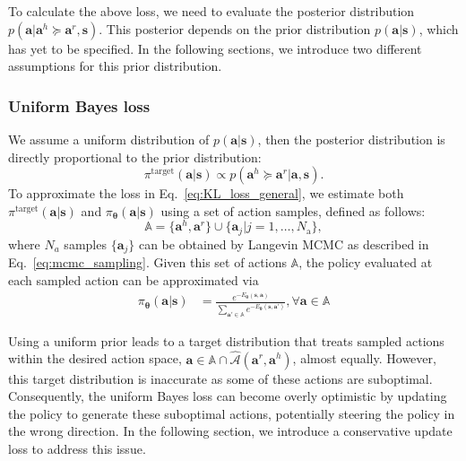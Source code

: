 To calculate the above loss, we need to evaluate the posterior distribution $p(\bm a|\bm a^h \succeq \bm a^r, \bm s) $.
This posterior depends on the prior distribution $p(\bm a | \bm s)$, which has yet to be specified.
In the following sections, we introduce two different assumptions for this prior distribution.

\subsubsection{ Uniform Bayes loss}
\label{sec:sub:sub:uniform_bayes_loss}
We assume a uniform distribution of $p(\bm a | \bm s)$, then the posterior distribution is directly proportional to the prior distribution:
\begin{equation*}
   \pi^{\text{target}}(\bm a| \bm s )  \propto p (\bm a^h \succeq \bm a^r | \bm a ,\bm s). 
\end{equation*}
To approximate the loss in Eq.~\eqref{eq:KL_loss_general}, 
we estimate both $\pi^{\text{target}}(\bm a| \bm s ) $ and $\pi_{\bm \theta}(\bm a | \bm s)$ using a set of action samples, defined as follows:
\begin{equation*}
    \mathbb A = \{ \bm a^h, \bm a^r\} \cup   \{\bm a_j | j = 1, \dots, N_{\text{a}} \},
\end{equation*}
where $N_a$ samples $\{\bm a_j \}$ can be obtained by Langevin MCMC as described in Eq.~\eqref{eq:mcmc_sampling}. 
Given this set of actions $\mathbb A $,
 the policy evaluated at each sampled action can be approximated via 
\begin{align}
\label{eq:estiamtion_policy_EBM}
    \pi_{\bm \theta}(\bm a | \bm s) & = \frac{e^{-E_{\bm \theta}(\bm s, \bm a)}}{\sum_{\bm a' \in \mathbb A} e^{-E_{\bm \theta}(\bm s, \bm a')}}, \forall \bm a \in \mathbb A
\end{align}


Using a uniform prior leads to a target distribution that treats sampled actions within the desired action space, $\bm a \in \mathbb{A} \cap \hat{ \mathcal{A}}{(\bm a^r, \bm a^h)}$, almost equally.
However, this target distribution is inaccurate as some of these actions are suboptimal.
Consequently, the uniform Bayes loss can become overly optimistic by updating the policy to generate these suboptimal actions, potentially steering the policy in the wrong direction.
In the following section, we introduce a conservative update loss to address this issue.

